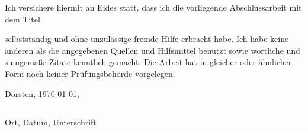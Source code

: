 \noindent Ich versichere hiermit an Eides statt, dass ich die vorliegende Abschlussarbeit mit dem Titel

\begin{displayquote}
    \thetitle
\end{displayquote}

\noindent selbstständig und ohne unzulässige fremde Hilfe erbracht habe.
Ich habe keine anderen als die angegebenen Quellen und Hilfsmittel benutzt sowie wörtliche und sinngemäße Zitate kenntlich gemacht.
Die Arbeit hat in gleicher oder ähnlicher Form noch keiner Prüfungsbehörde vorgelegen.

\vspace{2cm}

\noindent Dorsten, \today,\\
\rule[10pt]{\textwidth}{0.4pt}
Ort, Datum, Unterschrift
